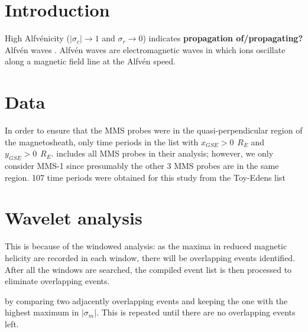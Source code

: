
\section{Introduction}
High Alfv\'enicity ($|\sigma_c| \rightarrow 1$ and $\sigma_r \rightarrow 0$) indicates \textbf{propagation of/propagating?} Alfv\'en waves \cite{Bavassano:1998}. Alfv\'en waves are electromagnetic waves in which ions oscillate along a magnetic field line at the Alfv\'en speed. 




\section{Data}
In order to ensure that the MMS probes were in the quasi-perpendicular region of the magnetosheath, only time periods in the list with $x_{GSE}>0\hspace{5pt}R_E$ and $y_{GSE}>0\hspace{5pt}R_E$.  includes all MMS probes in their analysis; however, we only consider MMS-1 since presumably the other 3 MMS probes are in the same region. 107 time periods were obtained for this study from the Toy-Edens list 




\section{Wavelet analysis}
This is because of the windowed analysis: as the maxima in reduced magnetic helicity are recorded in each window, there will be overlapping events identified. After all the windows are searched, the compiled event list is then processed to eliminate overlapping events.

by comparing two adjacently overlapping events and keeping the one with the highest maximum in $|\sigma_m|$. This is repeated until there are no overlapping events left.


